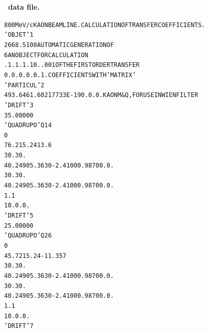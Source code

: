 \begin{tiny}

\twocolumn
\noindent \textbf{\normalsize  \zgoubi\ data file.}
\begin{alltt}
    800 MeV/c KAON BEAM LINE. CALCULATION OF TRANSFER COEFFICIENTS.             
   'OBJET'                                                                 1
   2668.5100                           AUTOMATIC  GENERATION  OF              
   6                                   AN  OBJECT  FOR  CALCULATION           
   .1  .1  .1  .1 0.  .001             OF  THE  FIRST  ORDER  TRANSFER                 
   0. 0. 0. 0. 0. 1.                   COEFFICIENTS  WITH  'MATRIX'           
   'PARTICUL'                                                              2
    493.646 1.60217733E-19 0. 0. 0.    KAON M & Q, FOR USE IN WIEN FILTER     
   'DRIFT'                                                                 3
    35.00000                                                                    
   'QUADRUPO'                            Q1                                4
   0                                                        
     76.2  15.24  13.6                                                          
    30.  30.                                                                    
    4    0.2490   5.3630  -2.4100   0.9870   0.   0.                            
    30. 30.                                                                     
    4    0.2490   5.3630  -2.4100   0.9870   0.   0.                            
     1.1                                                                        
    1  0. 0. 0.                                                                 
   'DRIFT'                                                                 5
     25.00000                                                                   
   'QUADRUPO'                            Q2                                6
   0                                                        
   45.72  15.24   -11.357                                                       
    30. 30.                                                                     
    4    0.2490   5.3630  -2.4100   0.9870   0.   0.                            
    30. 30.                                                                     
    4    0.2490   5.3630  -2.4100   0.9870   0.   0.                            
     1.1                                                                        
    1  0. 0. 0.                                                                 
   'DRIFT'                                                                 7

\end{alltt}
\end{tiny}
